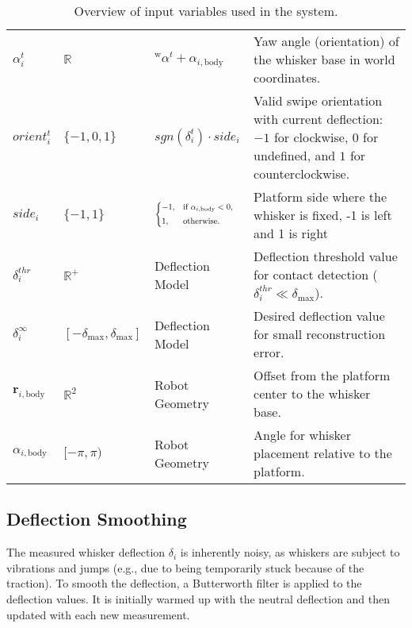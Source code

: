\begin{table}[htb]
\begin{tabular}{p{1cm} p{2cm} p{3cm} p{8cm}}
        \(\alpha_{i}^{t}\)                    & \(\mathbb{R}\)                                     & \(^{\mathrm{w}}\alpha^{t} + \alpha_{i, \textrm{body}}\) & Yaw angle (orientation) of the whisker base in world coordinates.                                                           \\
        \(orient_{i}^{t}\)                    & \(\{-1, 0, 1\}\)                                   & \(sgn(\delta_{i}^{t}) \cdot side_{i}\)                  & Valid swipe orientation with current deflection: \(-1\) for clockwise, \(0\) for undefined, and \(1\) for counterclockwise. \\
        \(side_{i}\)                          & \(\{-1, 1\}\)                                      & \(\branch{\alpha_{i,\mathrm{body}} < 0}{-1}{1}\)        & Platform side where the whisker is fixed, -1 is left and 1 is right                                                         \\
        \(\delta_{i}^{thr}\)                  & \(\mathbb{R}^{+}\)                                 & Deflection Model                                        & Deflection threshold value for contact detection (\(\delta_{i}^{thr}\ll\delta_{\textrm{max}}\)).                    \\
        \(\delta_{i}^{\infty}\)               & \([-\delta_{\textrm{max}},\delta_{\textrm{max}}]\) & Deflection Model                                        & Desired deflection value for small reconstruction error.                                                                        \\
        \(\boldsymbol{r}_{i, \textrm{body}}\) & \(\mathbb{R}^2\)                                   & Robot Geometry                                          & Offset from the platform center to the whisker base.                                                                        \\
        \(\alpha_{i, \textrm{body}}\)         & \([-\pi,\pi)\)                                     & Robot Geometry                                          & Angle for whisker placement relative to the platform.                                                                       \\
        \bottomrule
    \end{tabular}
    \caption{Overview of input variables used in the system.}
    \label{tab:variables}
\end{table}

\subsection{Deflection Smoothing}
The measured whisker deflection \(\delta_{i}\) is inherently noisy, as whiskers are subject to vibrations and jumps (e.g., due to being temporarily stuck because of the traction).
To smooth the deflection, a Butterworth filter is applied to the deflection values.
It is initially warmed up with the neutral deflection and then updated with each new measurement.


